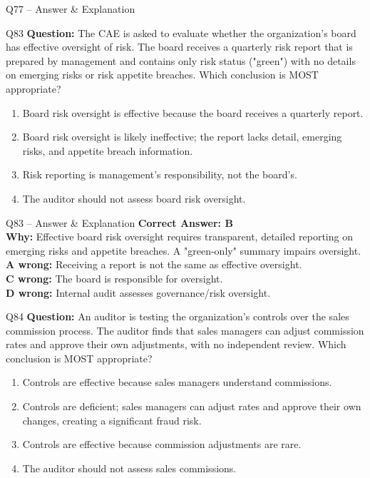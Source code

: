 \documentclass[aspectratio=169,10pt]{beamer}
\begin{document}
\begin{frame}[t]{Q77 -- Answer \& Explanation}
	\begin{frame}[t]{Q83}
		\small
		\textbf{Question:} The CAE is asked to evaluate whether the organization's board has effective oversight of risk. The board receives a quarterly risk report that is prepared by management and contains only risk status ("green") with no details on emerging risks or risk appetite breaches. Which conclusion is MOST appropriate?
		\begin{enumerate}[label=\Alph*.,itemsep=1pt,topsep=2pt]
			\item Board risk oversight is effective because the board receives a quarterly report.
			\item Board risk oversight is likely ineffective; the report lacks detail, emerging risks, and appetite breach information.
			\item Risk reporting is management's responsibility, not the board's.
			\item The auditor should not assess board risk oversight.
		\end{enumerate}
	\end{frame}
	
	\begin{frame}[t]{Q83 -- Answer \& Explanation}
		\small
		\textbf{Correct Answer: B} \\[4pt]
		\textbf{Why:} Effective board risk oversight requires transparent, detailed reporting on emerging risks and appetite breaches. A "green-only" summary impairs oversight. \\[4pt]
		\textbf{A wrong:} Receiving a report is not the same as effective oversight. \\[2pt]
		\textbf{C wrong:} The board is responsible for oversight. \\[2pt]
		\textbf{D wrong:} Internal audit assesses governance/risk oversight.
	\end{frame}
	
	\begin{frame}[t]{Q84}
		\small
		\textbf{Question:} An auditor is testing the organization's controls over the sales commission process. The auditor finds that sales managers can adjust commission rates and approve their own adjustments, with no independent review. Which conclusion is MOST appropriate?
		\begin{enumerate}[label=\Alph*.,itemsep=1pt,topsep=2pt]
			\item Controls are effective because sales managers understand commissions.
			\item Controls are deficient; sales managers can adjust rates and approve their own changes, creating a significant fraud risk.
			\item Controls are effective because commission adjustments are rare.
			\item The auditor should not assess sales commissions.
		\end{enumerate}
	\end{frame}
	

\end{frame}
\end{document}
